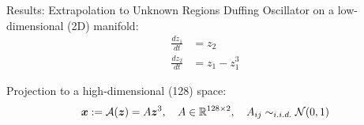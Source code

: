 \documentclass[8pt]{beamer}
\begin{document}
\begin{frame}{Results: Extrapolation to Unknown Regions}
Duffing Oscillator on a low-dimensional (2D) manifold:
\begin{equation}
    \label{eq:duffing_definition}
    \begin{split}
    \frac{dz_1}{dt} & = z_2 \\ 
    \frac{dz_2}{dt} & = z_1 - z_1^3
    \end{split}
\end{equation}

Projection to a high-dimensional (128) space:
\begin{equation}
    \label{eq:duffing_true_decoder}
    \boldsymbol{x} := \mathcal{A}(\boldsymbol{z}) = A\boldsymbol{z}^3, \quad A \in \mathbb{R}^{128 \times 2}, \quad A_{ij} \sim_{i.i.d.} \mathcal{N}(0, 1)
\end{equation}
\end{frame}
\end{document}
